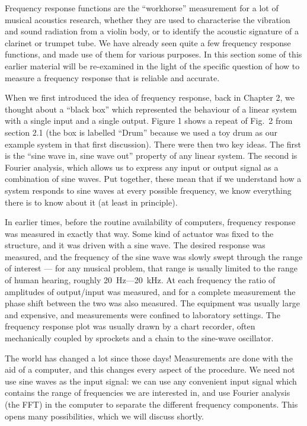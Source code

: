 

  Frequency response functions are the “workhorse” measurement for a lot of 
  musical acoustics research, whether they are used to characterise the 
  vibration and sound radiation from a violin body, or to identify the acoustic 
  signature of a clarinet or trumpet tube. We have already seen quite a few 
  frequency response functions, and made use of them for various purposes. In 
  this section some of this earlier material will be re-examined in the light 
  of the specific question of how to measure a frequency response that is 
  reliable and accurate. 

  When we first introduced the idea of frequency response, back in Chapter 2, 
  we thought about a “black box” which represented the behaviour of a linear 
  system with a single input and a single output. Figure 1 shows a repeat of 
  Fig.\ 2 from section 2.1 (the box is labelled “Drum” because we used a toy 
  drum as our example system in that first discussion). There were then two key 
  ideas. The first is the “sine wave in, sine wave out” property of any linear 
  system. The second is Fourier analysis, which allows us to express any input 
  or output signal as a combination of sine waves. Put together, these mean 
  that if we understand how a system responds to sine waves at every possible 
  frequency, we know everything there is to know about it (at least in 
  principle). 


  In earlier times, before the routine availability of computers, frequency 
  response was measured in exactly that way. Some kind of actuator was fixed to 
  the structure, and it was driven with a sine wave. The desired response was 
  measured, and the frequency of the sine wave was slowly swept through the 
  range of interest — for any musical problem, that range is usually limited to 
  the range of human hearing, roughly 20~Hz—20~kHz. At each frequency the ratio 
  of amplitudes of output/input was measured, and for a complete measurement 
  the phase shift between the two was also measured. The equipment was usually 
  large and expensive, and measurements were confined to laboratory settings. 
  The frequency response plot was usually drawn by a chart recorder, often 
  mechanically coupled by sprockets and a chain to the sine-wave oscillator. 

  The world has changed a lot since those days! Measurements are done with the 
  aid of a computer, and this changes every aspect of the procedure. We need 
  not use sine waves as the input signal: we can use any convenient input 
  signal which contains the range of frequencies we are interested in, and use 
  Fourier analysis (the FFT) in the computer to separate the different 
  frequency components. This opens many possibilities, which we will discuss 
  shortly. 

